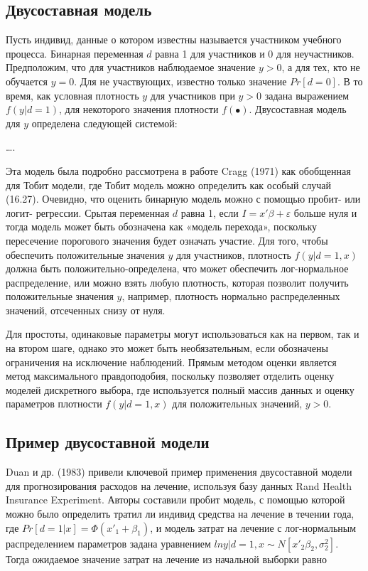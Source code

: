 \subsection{Двусоставная модель}

Пусть индивид, данные о котором известны называется участником учебного процесса. Бинарная переменная $d$ равна 1 для участников и 0 для неучастников. Предположим, что для участников наблюдаемое значение $y>0$, а для тех, кто не обучается $y=0$. Для не участвующих, известно только значение $Pr[d=0]$. В то время, как условная плотность $y$ для участников при $y>0$ задана выражением $f(y|d=1)$, для некоторого значения плотности $f(\bullet)$. Двусоставная модель для $y$ определена следующей системой:

\ldots .

Эта модель была подробно рассмотрена в работе Cragg (1971) как обобщенная для Тобит модели, где Тобит модель можно определить как особый случай (16.27). Очевидно, что оценить бинарную модель можно с помощью пробит- или логит- регрессии. Срытая переменная $d$ равна 1, если $I=x'\beta+\varepsilon$ больше нуля и тогда модель может быть обозначена как «модель перехода», поскольку пересечение порогового значения будет означать участие. Для того, чтобы обеспечить положительные значения $y$ для участников, плотность $f(y|d=1,x)$ должна быть положительно-определена, что может обеспечить лог-нормальное распределение, или можно взять любую плотность, которая позволит получить положительные значения $y$, например, плотность нормально распределенных значений, отсеченных снизу от нуля.

Для простоты, одинаковые параметры могут использоваться как на первом, так и на втором шаге, однако это может быть необязательным, если обозначены ограничения на исключение наблюдений. Прямым методом оценки является метод максимального правдоподобия, поскольку позволяет отделить оценку моделей дискретного выбора, где используется полный массив данных и оценку параметров плотности $f(y|d=1,x)$ для положительных значений, $y>0$.


\subsection{Пример двусоставной модели}


Duan и др. (1983) привели ключевой пример применения двусоставной модели для прогнозирования расходов на лечение, используя базу данных Rand Health Insurance Experiment. Авторы составили пробит модель, с помощью которой можно было определить тратил ли индивид средства на лечение в течении года, где $Pr[d=1|x]=\Phi(x'_1+\beta_{1})$, и модель затрат на лечение с лог-нормальным распределением параметров задана уравнением $ln{y|d}=1, x{\sim}N[x'_2\beta_{2},\sigma^{2}_{2}]$. Тогда ожидаемое значение затрат на лечение из начальной выборки равно

